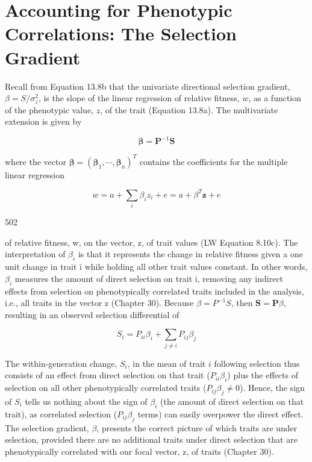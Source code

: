\documentclass{article}
\begin{document}
\section{Accounting for Phenotypic Correlations: The Selection Gradient}
Recall from Equation 13.8b that the univariate directional selection gradient,  $ \beta = S/\sigma_z^2 $, is the slope of the linear regression of relative fitness,  $ w $, as a function of the phenotypic value,  $ z $, of the trait (Equation 13.8a). The multivariate extension is given by

\begin{equation}
\boldsymbol{\beta}=\mathbf{P}^{-1}\mathbf{S}
\tag{13.25a}
\label{eq:13_25a}
\end{equation}

where the vector  $ \boldsymbol{\beta} = (\boldsymbol{\beta}_1, \cdots, \boldsymbol{\beta}_n)^T $ contains the coefficients for the multiple linear regression

\begin{equation}
w=a+\sum_{i}\beta_{i}z_{i}+e=a+\beta^{T}\mathbf{z}+e
\tag{13.25b}
\label{eq:13_25b}
\end{equation}

502

of relative fitness, w, on the vector, z, of trait values (LW Equation 8.10c). The interpretation of  $ \beta_i $ is that it represents the change in relative fitness given a one unit change in trait i while holding all other trait values constant. In other words,  $ \beta_i $ measures the amount of direct selection on trait i, removing any indirect effects from selection on phenotypically correlated traits included in the analysis, i.e., all traits in the vector z (Chapter 30). Because  $ \beta = P^{-1}S $, then  $ \mathbf{S} = \mathbf{P}\beta $, resulting in an observed selection differential of

\begin{equation}
S_{i}=P_{ii}\beta_{i}+\sum_{j\neq i}P_{ij}\beta_{j}
\tag{13.25c}
\label{eq:13_25c}
\end{equation}

The within-generation change, $S_i$, in the mean of trait $i$ following selection thus consists of an effect from direct selection on that trait ($P_{ii}\beta_i$) plus the effects of selection on all other phenotypically correlated traits ($P_{ij}\beta_j \neq 0$). Hence, the sign of $S_i$ tells us nothing about the sign of $\beta_i$ (the amount of direct selection on that trait), as correlated selection ($P_{ij}\beta_j$ terms) can easily overpower the direct effect. The selection gradient, $\beta$, presents the correct picture of which traits are under selection, provided there are no additional traits under direct selection that are phenotypically correlated with our focal vector, z, of traits (Chapter 30).
\end{document}
